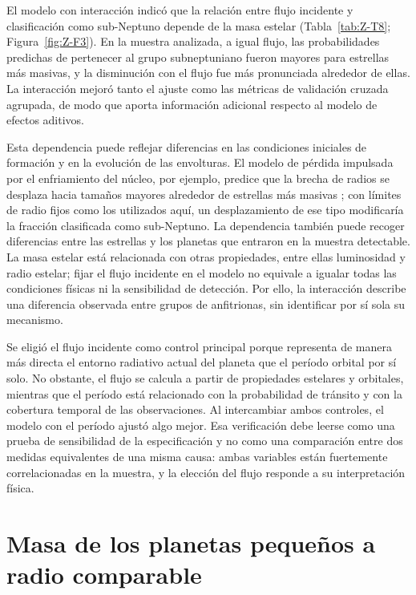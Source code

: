 El modelo con interacción indicó que la relación entre flujo incidente y clasificación como sub-Neptuno depende de la masa estelar (Tabla~\ref{tab:Z-T8}; Figura~\ref{fig:Z-F3}). En la muestra analizada, a igual flujo, las probabilidades predichas de pertenecer al grupo subneptuniano fueron mayores para estrellas más masivas, y la disminución con el flujo fue más pronunciada alrededor de ellas. La interacción mejoró tanto el ajuste como las métricas de validación cruzada agrupada, de modo que aporta información adicional respecto al modelo de efectos aditivos.

Esta dependencia puede reflejar diferencias en las condiciones iniciales de formación y en la evolución de las envolturas. El modelo de pérdida impulsada por el enfriamiento del núcleo, por ejemplo, predice que la brecha de radios se desplaza hacia tamaños mayores alrededor de estrellas más masivas \parencite{gupta2020}; con límites de radio fijos como los utilizados aquí, un desplazamiento de ese tipo modificaría la fracción clasificada como sub-Neptuno. La dependencia también puede recoger diferencias entre las estrellas y los planetas que entraron en la muestra detectable. La masa estelar está relacionada con otras propiedades, entre ellas luminosidad y radio estelar; fijar el flujo incidente en el modelo no equivale a igualar todas las condiciones físicas ni la sensibilidad de detección. Por ello, la interacción describe una diferencia observada entre grupos de anfitrionas, sin identificar por sí sola su mecanismo.

Se eligió el flujo incidente como control principal porque representa de manera más directa el entorno radiativo actual del planeta que el período orbital por sí solo. No obstante, el flujo se calcula a partir de propiedades estelares y orbitales, mientras que el período está relacionado con la probabilidad de tránsito y con la cobertura temporal de las observaciones. Al intercambiar ambos controles, el modelo con el período ajustó algo mejor. Esa verificación debe leerse como una prueba de sensibilidad de la especificación y no como una comparación entre dos medidas equivalentes de una misma causa: ambas variables están fuertemente correlacionadas en la muestra, y la elección del flujo responde a su interpretación física.

\section{Masa de los planetas pequeños a radio comparable}
\label{sec:dis-masa}

